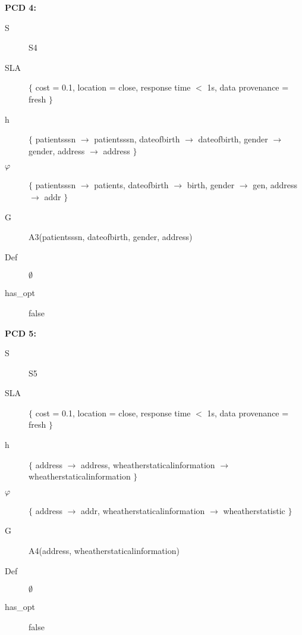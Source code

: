 \documentclass[12pt,a4paper,oneside]{report}
\begin{document}
\begin{flushleft}
\textbf{PCD 4:}
\end{flushleft}
\begin{description}
\item[S] S4
\item[SLA] $\lbrace$ cost = 0.1, location = close, response time $<$ 1s, data provenance = fresh $\rbrace$
\item[h]  $\lbrace$ patientsssn $\longrightarrow$ patientsssn, dateofbirth $\longrightarrow$ dateofbirth, gender $\longrightarrow$ gender, address $\longrightarrow$ address $\rbrace$
\item[$\varphi$] $\lbrace$ patientsssn $\longrightarrow$ patients, dateofbirth $\longrightarrow$ birth, gender $\longrightarrow$ gen,  address $\longrightarrow$ addr $\rbrace$
\item[G] A3(patientsssn, dateofbirth, gender, address)
\item[Def] $\emptyset$
\item[has\_opt] false
\end{description}

\begin{flushleft}
\textbf{PCD 5:}
\end{flushleft}
\begin{description}
\item[S] S5
\item[SLA] $\lbrace$ cost = 0.1, location = close, response time $<$ 1s, data provenance = fresh $\rbrace$
\item[h]  $\lbrace$ address $\longrightarrow$ address, wheatherstaticalinformation $\longrightarrow$ wheatherstaticalinformation $\rbrace$
\item[$\varphi$] $\lbrace$ address $\longrightarrow$ addr,  wheatherstaticalinformation $\longrightarrow$ wheatherstatistic $\rbrace$
\item[G] A4(address, wheatherstaticalinformation)
\item[Def] $\emptyset$
\item[has\_opt] false
\end{description}
\end{document}
